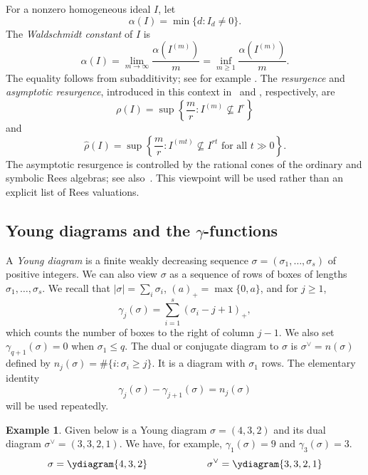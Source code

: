 \documentclass[11pt,reqno]{amsart}
\numberwithin{equation}{subsection}
\theoremstyle{definition}
\newtheorem{example}[theorem]{Example}
\theoremstyle{remark}
\begin{document}
For a nonzero homogeneous ideal $I$, let
\[
 \alpha(I)=\min\{d:I_d\ne0\}.
\]
The {\em Waldschmidt constant} of $I$ is
\[
 \widehat\alpha(I)=\lim_{m\to\infty}\frac{\alpha(I^{(m)})}{m}
 =\inf_{m\ge1}\frac{\alpha(I^{(m)})}{m}.
\]
The equality follows from subadditivity; see for example \cite[Lemma~3.3 and Definition~3.5]{DiPasqualeNguyenSeceleanu2023}.
The {\em resurgence} and {\em asymptotic resurgence}, introduced in this context
in~\cite{BocciHarbourne} and \cite{GuardoHarbourneVanTuyl2013}, respectively, are
\[
 \rho(I)=\sup\left\{\frac mr:I^{(m)}\not\subseteq I^r\right\}
\]
and
\begin{equation}\label{eq:asymptotic-resurgence}
 \widehat\rho(I)=
 \sup\left\{\frac mr:
 I^{(mt)}\not\subseteq I^{rt}\text{ for all }t\gg0\right\}.
\end{equation}
The asymptotic resurgence is controlled by the rational cones of the
ordinary and symbolic Rees algebras; see also~\cite{DFMS}.  This viewpoint will be used
rather than an explicit list of Rees valuations.

\subsection{Young diagrams and the $\gamma$-functions}

A \emph{Young diagram} is a finite weakly decreasing sequence
$\sigma=(\sigma_1,\ldots,\sigma_s)$ of positive integers. We can also view $\sigma$ as a sequence of rows of boxes of lengths $\sigma_1,\ldots,\sigma_s$. We recall that $|\sigma|=\sum_i\sigma_i$,  $(a)_+=\max\{0,a\}$, and for $j\ge1$, 
\begin{equation}\label{eq:gamma-def}
 \gamma_j(\sigma)=
 \sum_{i=1}^{s}(\sigma_i-j+1)_+,
\end{equation}
which counts the number of boxes to the right of column $j-1$.
We also set $\gamma_{q+1}(\sigma)=0$ when $\sigma_1\leq q$. 
The dual or conjugate diagram to $\sigma$ is $\sigma^\vee=n(\sigma)$ defined by 
$n_j(\sigma)=\#\{i:\sigma_i\ge j\}$. It is a diagram with $\sigma_1$ rows. The elementary identity
\begin{equation}\label{eq:gamma-difference}
 \gamma_j(\sigma)-\gamma_{j+1}(\sigma)=n_j(\sigma)
\end{equation}
will be used repeatedly.

\begin{example}
Given below is a Young diagram $\sigma=(4,3,2)$  and its dual
diagram $\sigma^\vee=(3,3,2,1)$. We have, for example, $\gamma_{1}(\sigma) = 9$ and $\gamma_{3}(\sigma) = 3$.
\[
\sigma=\ydiagram{4,3,2}
\qquad\qquad \qquad
\sigma^\vee=\ydiagram{3,3,2,1}
\]
\end{example}
\end{document}
